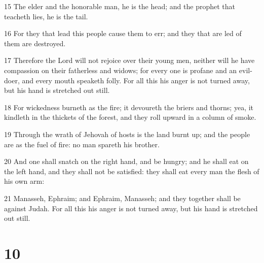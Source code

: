 \par 15 The elder and the honorable man, he is the head; and the prophet that teacheth lies, he is the tail.
\par 16 For they that lead this people cause them to err; and they that are led of them are destroyed.
\par 17 Therefore the Lord will not rejoice over their young men, neither will he have compassion on their fatherless and widows; for every one is profane and an evil-doer, and every mouth speaketh folly. For all this his anger is not turned away, but his hand is stretched out still.
\par 18 For wickedness burneth as the fire; it devoureth the briers and thorns; yea, it kindleth in the thickets of the forest, and they roll upward in a column of smoke.
\par 19 Through the wrath of Jehovah of hosts is the land burnt up; and the people are as the fuel of fire: no man spareth his brother.
\par 20 And one shall snatch on the right hand, and be hungry; and he shall eat on the left hand, and they shall not be satisfied: they shall eat every man the flesh of his own arm:
\par 21 Manasseh, Ephraim; and Ephraim, Manasseh; and they together shall be against Judah. For all this his anger is not turned away, but his hand is stretched out still.

\chapter{10}

